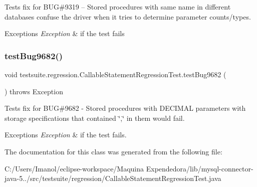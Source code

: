 Tests fix for B\+UG\#9319 -- Stored procedures with same name in different databases confuse the driver when it tries to determine parameter counts/types.


\begin{DoxyExceptions}{Exceptions}
{\em Exception} & if the test fails \\
\hline
\end{DoxyExceptions}
\mbox{\label{classtestsuite_1_1regression_1_1_callable_statement_regression_test_aa84b6f7f456f3d576c6d8c22213a24b2}} 
\subsubsection{\texorpdfstring{test\+Bug9682()}{testBug9682()}}
{\footnotesize\ttfamily void testsuite.\+regression.\+Callable\+Statement\+Regression\+Test.\+test\+Bug9682 (\begin{DoxyParamCaption}{ }\end{DoxyParamCaption}) throws Exception}

Tests fix for B\+UG\#9682 -\/ Stored procedures with D\+E\+C\+I\+M\+AL parameters with storage specifications that contained \char`\"{},\char`\"{} in them would fail.


\begin{DoxyExceptions}{Exceptions}
{\em Exception} & if the test fails. \\
\hline
\end{DoxyExceptions}


The documentation for this class was generated from the following file\+:\begin{DoxyCompactItemize}
\item 
C\+:/\+Users/\+Imanol/eclipse-\/workspace/\+Maquina Expendedora/lib/mysql-\/connector-\/java-\/5../src/testsuite/regression/Callable\+Statement\+Regression\+Test.\+java\end{DoxyCompactItemize}
